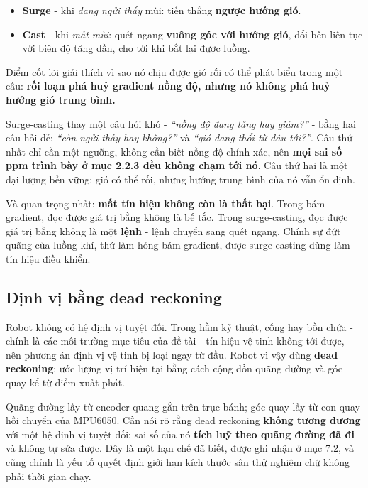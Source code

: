 \begin{itemize}[leftmargin=1.4em,itemsep=0.15em,topsep=0.3em]
  \item \textbf{Surge} - khi \textit{đang ngửi thấy} mùi: tiến thẳng \textbf{ngược hướng gió}.
  \item \textbf{Cast} - khi \textit{mất mùi}: quét ngang \textbf{vuông góc với hướng gió}, đổi bên liên tục với biên độ tăng dần, cho tới khi bắt lại được luồng.
\end{itemize}
Điểm cốt lõi giải thích vì sao nó chịu được gió rối có thể phát biểu trong một câu: \textbf{rối loạn phá huỷ gradient nồng độ, nhưng nó không phá huỷ hướng gió trung bình.}

Surge-casting thay một câu hỏi khó - \textit{``nồng độ đang tăng hay giảm?''} - bằng hai câu hỏi dễ: \textit{``còn ngửi thấy hay không?''} và \textit{``gió đang thổi từ đâu tới?''}. Câu thứ nhất chỉ cần một ngưỡng, không cần biết nồng độ chính xác, nên \textbf{mọi sai số ppm trình bày ở mục 2.2.3 đều không chạm tới nó}. Câu thứ hai là một đại lượng bền vững: gió có thể rối, nhưng hướng trung bình của nó vẫn ổn định.

Và quan trọng nhất: \textbf{mất tín hiệu không còn là thất bại}. Trong bám gradient, đọc được giá trị bằng không là bế tắc. Trong surge-casting, đọc được giá trị bằng không là một \textbf{lệnh} - lệnh chuyển sang quét ngang. Chính sự đứt quãng của luồng khí, thứ làm hỏng bám gradient, được surge-casting dùng làm tín hiệu điều khiển.

\subsection{Định vị bằng dead reckoning}
Robot không có hệ định vị tuyệt đối. Trong hầm kỹ thuật, cống hay bồn chứa - chính là các môi trường mục tiêu của đề tài - tín hiệu vệ tinh không tới được, nên phương án định vị vệ tinh bị loại ngay từ đầu. Robot vì vậy dùng \textbf{dead reckoning}: ước lượng vị trí hiện tại bằng cách cộng dồn quãng đường và góc quay kể từ điểm xuất phát.

Quãng đường lấy từ encoder quang gắn trên trục bánh; góc quay lấy từ con quay hồi chuyển của MPU6050. Cần nói rõ rằng dead reckoning \textbf{không tương đương} với một hệ định vị tuyệt đối: sai số của nó \textbf{tích luỹ theo quãng đường đã đi} và không tự sửa được. Đây là một hạn chế đã biết, được ghi nhận ở mục 7.2, và cũng chính là yếu tố quyết định giới hạn kích thước sân thử nghiệm chứ không phải thời gian chạy.
